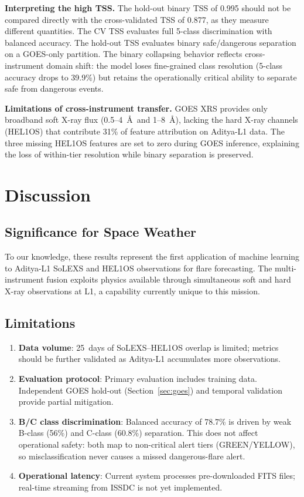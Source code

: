 \documentclass[twocolumn,10pt]{article}
\begin{document}
\textbf{Interpreting the high TSS.} The hold-out binary TSS of 0.995 should not be compared directly with the cross-validated TSS of 0.877, as they measure different quantities. The CV TSS evaluates full 5-class discrimination with balanced accuracy. The hold-out TSS evaluates binary safe/dangerous separation on a GOES-only partition. The binary collapsing behavior reflects cross-instrument domain shift: the model loses fine-grained class resolution (5-class accuracy drops to 39.9\%) but retains the operationally critical ability to separate safe from dangerous events.

\textbf{Limitations of cross-instrument transfer.} GOES XRS provides only broadband soft X-ray flux (0.5--4~\AA\ and 1--8~\AA), lacking the hard X-ray channels (HEL1OS) that contribute 31\% of feature attribution on Aditya-L1 data. The three missing HEL1OS features are set to zero during GOES inference, explaining the loss of within-tier resolution while binary separation is preserved.


\section{Discussion}\label{sec:discussion}

\subsection{Significance for Space Weather}

To our knowledge, these results represent the first application of machine learning to Aditya-L1 SoLEXS and HEL1OS observations for flare forecasting. The multi-instrument fusion exploits physics available through simultaneous soft and hard X-ray observations at L1, a capability currently unique to this mission.

\subsection{Limitations}

\begin{enumerate}[nosep]
  \item \textbf{Data volume}: 25~days of SoLEXS--HEL1OS overlap is limited; metrics should be further validated as Aditya-L1 accumulates more observations.
  \item \textbf{Evaluation protocol}: Primary evaluation includes training data. Independent GOES hold-out (Section~\ref{sec:goes}) and temporal validation provide partial mitigation.
  \item \textbf{B/C class discrimination}: Balanced accuracy of 78.7\% is driven by weak B-class (56\%) and C-class (60.8\%) separation. This does not affect operational safety: both map to non-critical alert tiers (GREEN/YELLOW), so misclassification never causes a missed dangerous-flare alert.
  \item \textbf{Operational latency}: Current system processes pre-downloaded FITS files; real-time streaming from ISSDC is not yet implemented.
\end{enumerate}
\end{document}
